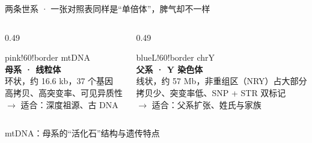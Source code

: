 \documentclass[aspectratio=169]{ctexbeamer}
\begin{document}
\begin{frame}{两条世系 · 一张对照表}{同样是“单倍体”，脾气却不一样}
  \vspace{0.5mm}

  \begin{columns}[t]
    \begin{column}{0.49\textwidth}
      \begin{cardc}{pink!60!border}
        \centering
        {\color{pinkL}\Large mtDNA}\\[1mm]
        {\color{pinkL}\bfseries 母系 · 线粒体}\\[1.5mm]
        {\color{muted}\footnotesize
          环状，约 16.6 kb，37 个基因\\
          高拷贝、高突变率、可见异质性\\[1mm]
          {\color{pinkL}$\to$ 适合：深度祖源、古 DNA}}
      \end{cardc}
    \end{column}
    \begin{column}{0.49\textwidth}
      \begin{cardc}{blueL!60!border}
        \centering
        {\color{blueL}\Large chrY}\\[1mm]
        {\color{blueL}\bfseries 父系 · Y 染色体}\\[1.5mm]
        {\color{muted}\footnotesize
          线状，约 57 Mb，非重组区（NRY）占大部分\\
          拷贝少、突变率低、SNP + STR 双标记\\[1mm]
          {\color{blueL}$\to$ 适合：父系扩张、姓氏与家族}}
      \end{cardc}
    \end{column}
  \end{columns}

\end{frame}

\begin{frame}{mtDNA：母系的“活化石”}{结构与遗传特点}
  \vspace{0.5mm}

\end{frame}
\end{document}
